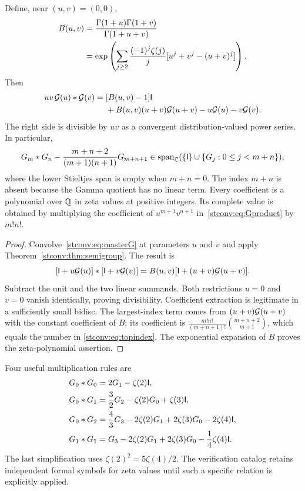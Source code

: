 \begin{theorem}\label{stconv:thm:product}
Define, near $(u,v)=(0,0)$,
\begin{align}
 B(u,v)&=\frac{\Gamma(1+u)\Gamma(1+v)}{\Gamma(1+u+v)}\label{stconv:eq:Buv}\\
 &=\exp\left(\sum_{j\ge2}\frac{(-1)^j\zeta(j)}j
          [u^j+v^j-(u+v)^j]\right).\notag
\end{align}
Then
\begin{align}
 uv\,\mathcal G(u)*\mathcal G(v)={}&[B(u,v)-1]\mathsf I\label{stconv:eq:Gproduct}\\
 &+B(u,v)(u+v)\mathcal G(u+v)-u\mathcal G(u)-v\mathcal G(v).\notag
\end{align}
The right side is divisible by $uv$ as a convergent distribution-valued
power series. In particular,
\begin{equation}\label{stconv:eq:topindex}
 G_m*G_n-\frac{m+n+2}{(m+1)(n+1)}G_{m+n+1}
       \in\operatorname{span}_{\mathbb C}(\{\mathsf I\}\cup\{G_j:0\le j<m+n\}),
\end{equation}
where the lower Stieltjes span is empty when $m+n=0$. The index
$m+n$ is absent because the Gamma quotient has no linear term. Every
coefficient is a polynomial over $\mathbb{Q}$ in zeta values at positive
integers. Its complete value is obtained by multiplying the coefficient
of $u^{m+1}v^{n+1}$ in~\eqref{stconv:eq:Gproduct} by $m!n!$.
\end{theorem}
\begin{proof}
Convolve~\eqref{stconv:eq:masterG} at parameters $u$ and $v$ and apply
Theorem~\ref{stconv:thm:semigroup}. The result is
\[
 [\mathsf I+u\mathcal G(u)]*[\mathsf I+v\mathcal G(v)]
 =B(u,v)[\mathsf I+(u+v)\mathcal G(u+v)].
\]
Subtract the unit and the two linear summands. Both restrictions $u=0$
and $v=0$ vanish identically, proving divisibility. Coefficient extraction
is legitimate in a sufficiently small bidisc. The largest-index term
comes from $(u+v)\mathcal G(u+v)$ with the constant coefficient of $B$; its
coefficient is
$\frac{m!n!}{(m+n+1)!}\binom{m+n+2}{m+1}$, which equals the number in
\eqref{stconv:eq:topindex}. The exponential expansion of $B$ proves the
zeta-polynomial assertion.
\end{proof}

Four useful multiplication rules are
\begin{align}
 G_0*G_0&=2G_1-\zeta(2)\mathsf I,\label{stconv:eq:product00}\\
 G_0*G_1&=\frac32G_2-\zeta(2)G_0+\zeta(3)\mathsf I,\label{stconv:eq:product01}\\
 G_0*G_2&=\frac43G_3-2\zeta(2)G_1+2\zeta(3)G_0-2\zeta(4)\mathsf I,\label{stconv:eq:product02}\\
 G_1*G_1&=G_3-2\zeta(2)G_1+2\zeta(3)G_0-\frac14\zeta(4)\mathsf I.
 \label{stconv:eq:product11}
\end{align}
The last simplification uses $\zeta(2)^2=5\zeta(4)/2$. The verification
catalog retains independent formal symbols for zeta values until such a
specific relation is explicitly applied.

